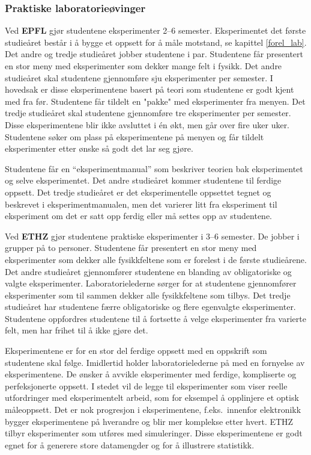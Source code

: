 \documentclass{article}
\begin{document}
\subsubsection{Praktiske laboratorieøvinger}
Ved \textbf{EPFL} gjør studentene eksperimenter 2--6 semester. Eksperimentet det første studieåret består i å bygge et oppsett for å måle motstand, se kapittel \ref{forel_lab}. Det andre og tredje studieåret jobber studentene i par. Studentene får presentert en stor meny med eksperimenter som dekker mange felt i fysikk. Det andre studieåret skal studentene gjennomføre sju eksperimenter per semester. I hovedsak er disse eksperimentene basert på teori som studentene er godt kjent med fra før. Studentene får tildelt en "pakke" med eksperimenter fra menyen. Det tredje studieåret skal studentene gjennomføre tre eksperimenter per semester. Disse eksperimentene blir ikke avsluttet i én økt, men går over fire uker uker. Studentene søker om plass på eksperimentene på menyen og får tildelt eksperimenter etter ønske så godt det lar seg gjøre.

Studentene får en ``eksperimentmanual'' som beskriver teorien bak eksperimentet og selve eksperimentet. Det andre studieåret kommer studentene til ferdige oppsett. Det tredje studieåret er det eksperimentelle oppsettet tegnet og beskrevet i eksperimentmanualen, men det varierer litt fra eksperiment til eksperiment om det er satt opp ferdig eller må settes opp av studentene.

Ved \textbf{ETHZ} gjør studentene praktiske eksperimenter i 3--6 semester. De jobber i grupper på to personer. Studentene får presentert en stor meny med eksperimenter som dekker alle fysikkfeltene som er forelest i de første studieårene. Det andre studieåret gjennomfører studentene en blanding av obligatoriske og valgte eksperimenter. Laboratorielederne sørger for at studentene gjennomfører eksperimenter som til sammen dekker alle fysikkfeltene som tilbys.  Det tredje studieåret har studentene færre obligatoriske og flere egenvalgte eksperimenter. Studentene oppfordres studentene til å fortsette å velge eksperimenter fra varierte felt, men har frihet til å ikke gjøre det.

Eksperimentene er for en stor del ferdige oppsett med en oppskrift som studentene skal følge. Imidlertid holder laboratorielederne på med en fornyelse av eksperimentene. De ønsker å avvikle eksperimenter med ferdige, kompliserte og perfeksjonerte oppsett. I stedet vil de legge til eksperimenter som viser reelle utfordringer med eksperimentelt arbeid, som for eksempel å opplinjere et optisk måleoppsett. Det er nok progresjon i eksperimentene, f.eks.~innenfor elektronikk bygger eksperimentene på hverandre og blir mer komplekse etter hvert. ETHZ tilbyr eksperimenter som utføres med simuleringer. Disse eksperimentene er godt egnet for å generere store datamengder og for å illustrere statistikk.
\end{document}
